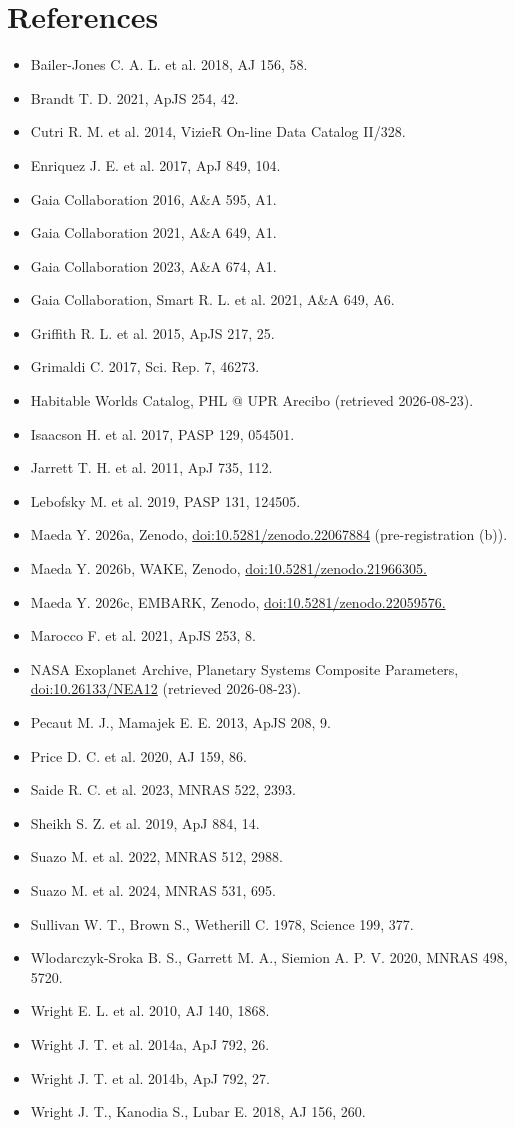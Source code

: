 \documentclass[11pt]{article}
\begin{document}
\section*{References}

\begin{itemize}\setlength{\itemsep}{1pt}
\item Bailer-Jones C. A. L. et al. 2018, AJ 156, 58.
\item Brandt T. D. 2021, ApJS 254, 42.
\item Cutri R. M. et al. 2014, VizieR On-line Data Catalog II/328.
\item Enriquez J. E. et al. 2017, ApJ 849, 104.
\item Gaia Collaboration 2016, A\&A 595, A1.
\item Gaia Collaboration 2021, A\&A 649, A1.
\item Gaia Collaboration 2023, A\&A 674, A1.
\item Gaia Collaboration, Smart R. L. et al. 2021, A\&A 649, A6.
\item Griffith R. L. et al. 2015, ApJS 217, 25.
\item Grimaldi C. 2017, Sci. Rep. 7, 46273.
\item Habitable Worlds Catalog, PHL @ UPR Arecibo (retrieved 2026-08-23).
\item Isaacson H. et al. 2017, PASP 129, 054501.
\item Jarrett T. H. et al. 2011, ApJ 735, 112.
\item Lebofsky M. et al. 2019, PASP 131, 124505.
\item Maeda Y. 2026a, Zenodo, \url{doi:10.5281/zenodo.22067884} (pre-registration (b)).
\item Maeda Y. 2026b, WAKE, Zenodo, \url{doi:10.5281/zenodo.21966305.}
\item Maeda Y. 2026c, EMBARK, Zenodo, \url{doi:10.5281/zenodo.22059576.}
\item Marocco F. et al. 2021, ApJS 253, 8.
\item NASA Exoplanet Archive, Planetary Systems Composite Parameters, \url{doi:10.26133/NEA12} (retrieved 2026-08-23).
\item Pecaut M. J., Mamajek E. E. 2013, ApJS 208, 9.
\item Price D. C. et al. 2020, AJ 159, 86.
\item Saide R. C. et al. 2023, MNRAS 522, 2393.
\item Sheikh S. Z. et al. 2019, ApJ 884, 14.
\item Suazo M. et al. 2022, MNRAS 512, 2988.
\item Suazo M. et al. 2024, MNRAS 531, 695.
\item Sullivan W. T., Brown S., Wetherill C. 1978, Science 199, 377.
\item Wlodarczyk-Sroka B. S., Garrett M. A., Siemion A. P. V. 2020, MNRAS 498, 5720.
\item Wright E. L. et al. 2010, AJ 140, 1868.
\item Wright J. T. et al. 2014a, ApJ 792, 26.
\item Wright J. T. et al. 2014b, ApJ 792, 27.
\item Wright J. T., Kanodia S., Lubar E. 2018, AJ 156, 260.
\end{itemize}
\end{document}
